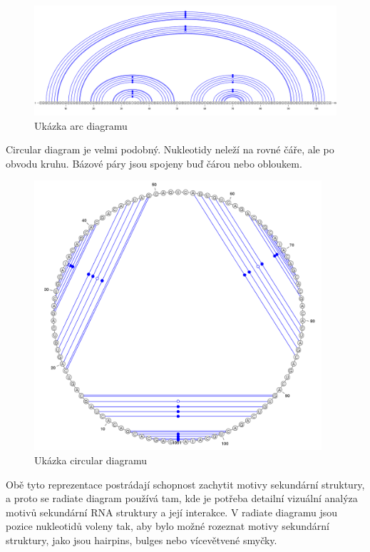 \begin{figure}[H]
  \centering
  \includegraphics[width=140mm]{../img/kap01/arc.png}
  \caption{Ukázka arc diagramu}
\end{figure}

Circular diagram je velmi podobný. Nukleotidy neleží na rovné čáře, ale po
obvodu kruhu. Bázové páry jsou spojeny buď čárou nebo obloukem.

\begin{figure}[H]
  \centering
  \includegraphics[height=100mm]{../img/kap01/circular.png}
  \caption{Ukázka circular diagramu}
\end{figure}

Obě tyto reprezentace postrádají schopnost zachytit motivy sekundární
struktury, a proto se radiate diagram používá tam, kde je potřeba detailní
vizuální analýza motivů sekundární RNA struktury a její interakce. V radiate
diagramu jsou pozice nukleotidů voleny tak, aby bylo možné rozeznat motivy
sekundární struktury, jako jsou hairpins, bulges nebo vícevětvené smyčky.

